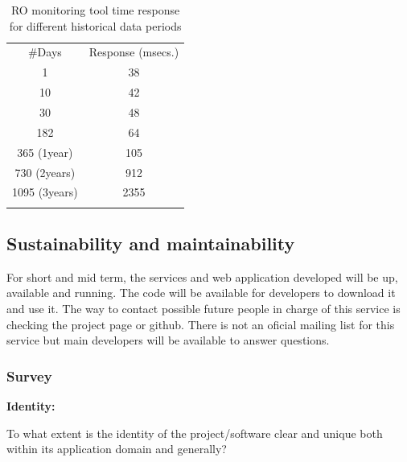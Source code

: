 \begin{longtable}[c]{@{}cc@{}}
\hline\noalign{\medskip}
\#Days & Response (msecs.)
\\\noalign{\medskip}
\hline\noalign{\medskip}
1 & 38
\\\noalign{\medskip}
10 & 42
\\\noalign{\medskip}
30 & 48
\\\noalign{\medskip}
182 & 64
\\\noalign{\medskip}
365 (1year) & 105
\\\noalign{\medskip}
730 (2years) & 912
\\\noalign{\medskip}
1095 (3years) & 2355
\\\noalign{\medskip}
\hline
\caption{RO monitoring tool time response for different historical data
periods}
\end{longtable}


\subsection{Sustainability and maintainability}

For short and mid term, the services and web application developed will
be up, available and running. The code will be available for developers
to download it and use it. The way to contact possible future people in
charge of this service is checking the project page or github. There is
not an oficial mailing list for this service but main developers will be
available to answer questions.

\subsubsection{Survey}

\textbf{Identity:}

To what extent is the identity of the project/software clear and unique
both within its application domain and generally?

